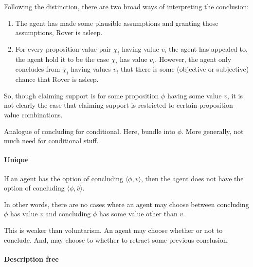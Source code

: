 \begin{note}[Suppositions]
  Following the distinction, there are two broad ways of interpreting the conclusion:
  \begin{enumerate}
  \item
    The agent has made some plausible assumptions and granting those assumptions, Rover is asleep.
  \item
    For every proposition-value pair \(\chi_{i}\) having value \(v_{i}\) the agent has appealed to, the agent hold it to be the case \(\chi_{i}\) has value \(v_{i}\).
    However, the agent only concludes from \(\chi_{i}\) having values \(v_{i}\) that there is some (objective or subjective) chance that Rover is asleep.
  \end{enumerate}
  So, though claiming support is for some proposition \(\phi\) having some value \(v\), it is not clearly the case that claiming support is restricted to certain proposition-value combinations.
\end{note}

\begin{note}[Analogue]
  Analogue of concluding for conditional.
  Here, bundle into \(\phi\).
  More generally, not much need for conditional stuff.
\end{note}

\paragraph{Unique}

\begin{note}[Unique]
  \begin{assumption}
    \label{assu:conc:unique}
    If an agent has the option of concluding \(\langle \phi,v \rangle\), then the agent does not have the option of concluding \(\langle \phi,\overline{v} \rangle\).
  \end{assumption}
  In other words, there are no cases where an agent may choose between concluding \(\phi\) has value \(v\) and concluding \(\phi\) has some value other than \(v\).

  This is weaker than voluntarism.
  An agent may choose whether or not to conclude.
  And, may choose to whether to retract some previous conclusion.
\end{note}

\paragraph{Description free}

